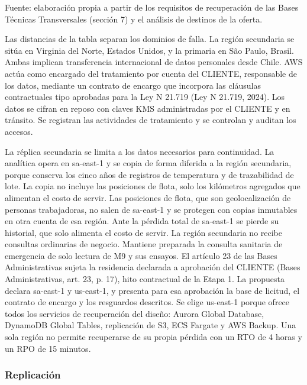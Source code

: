 {\fontsize{9pt}{11pt}\selectfont\raggedright Fuente: elaboración propia a partir de los requisitos de recuperación de las Bases Técnicas Transversales (sección 7) y el análisis de destinos de la oferta.\par}

Las distancias de la tabla separan los dominios de falla. La región secundaria se sitúa en Virginia del Norte, Estados Unidos, y la primaria en São Paulo, Brasil. Ambas implican transferencia internacional de datos personales desde Chile. AWS actúa como encargado del tratamiento por cuenta del CLIENTE, responsable de los datos, mediante un contrato de encargo que incorpora las cláusulas contractuales tipo aprobadas para la Ley N\textdegree{} 21.719 (Ley N\textdegree{} 21.719, 2024). Los datos se cifran en reposo con claves KMS administradas por el CLIENTE y en tránsito. Se registran las actividades de tratamiento y se controlan y auditan los accesos.

La réplica secundaria se limita a los datos necesarios para continuidad. La analítica opera en sa-east-1 y se copia de forma diferida a la región secundaria, porque conserva los cinco años de registros de temperatura y de trazabilidad de lote. La copia no incluye las posiciones de flota, solo los kilómetros agregados que alimentan el costo de servir. Las posiciones de flota, que son geolocalización de personas trabajadoras, no salen de sa-east-1 y se protegen con copias inmutables en otra cuenta de esa región. Ante la pérdida total de sa-east-1 se pierde su historial, que solo alimenta el costo de servir. La región secundaria no recibe consultas ordinarias de negocio. Mantiene preparada la consulta sanitaria de emergencia de solo lectura de M9 y sus ensayos. El artículo 23 de las Bases Administrativas sujeta la residencia declarada a aprobación del CLIENTE (Bases Administrativas, art. 23, p. 17), hito contractual de la Etapa 1. La propuesta declara sa-east-1 y us-east-1, y presenta para esa aprobación la base de licitud, el contrato de encargo y los resguardos descritos. Se elige us-east-1 porque ofrece todos los servicios de recuperación del diseño: Aurora Global Database, DynamoDB Global Tables, replicación de S3, ECS Fargate y AWS Backup. Una sola región no permite recuperarse de su propia pérdida con un RTO de 4 horas y un RPO de 15 minutos.

\subsubsection{Replicación}

